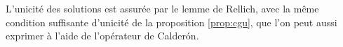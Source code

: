     
    
    

  L'unicité des solutions est assurée par le lemme de Rellich, avec la même condition suffisante d'unicité de la proposition \ref{prop:cgu}, que l'on peut aussi exprimer à l'aide de l'opérateur de Calderón.

